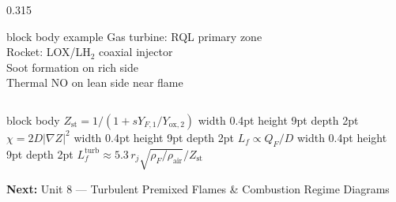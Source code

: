 \documentclass[12pt,aspectratio=169]{beamer}
\begin{document}
{\begin{frame}[plain, c]
\begin{columns}[t, totalwidth=\textwidth]
\begin{column}{0.315\textwidth}
      \begin{beamercolorbox}[rounded=true,wd=\linewidth,
                             sep=6pt,center]{block body example}
        \color{white}\fontsize{7.5}{10}\selectfont
        Gas turbine: RQL primary zone\\[3pt]
        Rocket: LOX/LH$_2$ coaxial injector\\[3pt]
        Soot formation on rich side\\[3pt]
        Thermal NO on lean side near flame
      \end{beamercolorbox}
    \end{column}
  \end{columns}

  \vspace{0.30cm}

  \begin{beamercolorbox}[rounded=true,wd=\textwidth,
                         sep=5pt,center]{block body}
    \color{skyblue!80}\fontsize{7.8}{10}\selectfont
    $Z_{\text{st}} = 1/(1+sY_{F,1}/Y_{\text{ox},2})$
    \quad\vrule width 0.4pt height 9pt depth 2pt\quad
    $\chi = 2D|\nabla Z|^2$
    \quad\vrule width 0.4pt height 9pt depth 2pt\quad
    $L_f \propto Q_F/D$
    \quad\vrule width 0.4pt height 9pt depth 2pt\quad
    $L_f^{\text{turb}} \approx 5.3\,r_j\sqrt{\rho_F/\rho_{\text{air}}}/Z_{\text{st}}$
  \end{beamercolorbox}

  \vspace{0.22cm}
  \begin{center}
    {\color{white!50}\fontsize{7.5}{9}\selectfont
     \textbf{Next:}\enspace
     Unit 8 --- Turbulent Premixed Flames \& Combustion Regime Diagrams}
  \end{center}
\end{frame}
}
\end{document}
